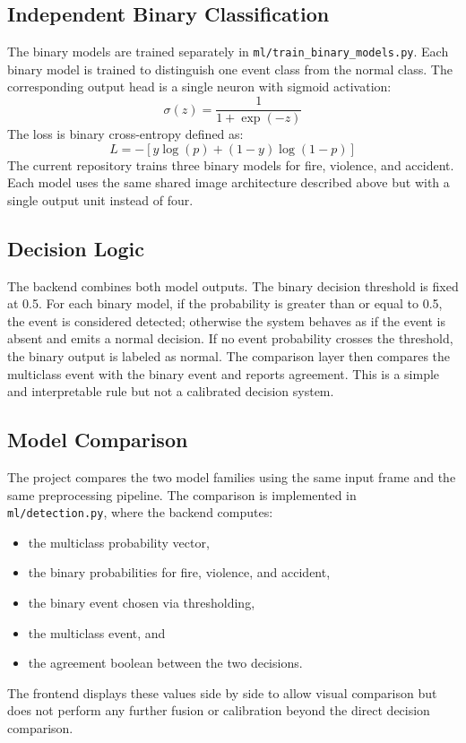 \documentclass[11pt,a4paper]{article}
\begin{document}
\subsection{Independent Binary Classification}
The binary models are trained separately in \texttt{ml/train\_binary\_models.py}. Each binary model is trained to distinguish one event class from the normal class. The corresponding output head is a single neuron with sigmoid activation:
\begin{equation}
\sigma(z)=\frac{1}{1+\exp(-z)}
\end{equation}
The loss is binary cross-entropy defined as:
\begin{equation}
L = -\left[y \log(p) + (1-y)\log(1-p)\right]
\end{equation}
The current repository trains three binary models for fire, violence, and accident. Each model uses the same shared image architecture described above but with a single output unit instead of four.

\subsection{Decision Logic}
The backend combines both model outputs. The binary decision threshold is fixed at 0.5. For each binary model, if the probability is greater than or equal to 0.5, the event is considered detected; otherwise the system behaves as if the event is absent and emits a normal decision. If no event probability crosses the threshold, the binary output is labeled as normal. The comparison layer then compares the multiclass event with the binary event and reports agreement. This is a simple and interpretable rule but not a calibrated decision system.

\subsection{Model Comparison}
The project compares the two model families using the same input frame and the same preprocessing pipeline. The comparison is implemented in \texttt{ml/detection.py}, where the backend computes:
\begin{itemize}[leftmargin=1.5em]
    \item the multiclass probability vector,
    \item the binary probabilities for fire, violence, and accident,
    \item the binary event chosen via thresholding,
    \item the multiclass event, and
    \item the agreement boolean between the two decisions.
\end{itemize}
The frontend displays these values side by side to allow visual comparison but does not perform any further fusion or calibration beyond the direct decision comparison.
\end{document}

